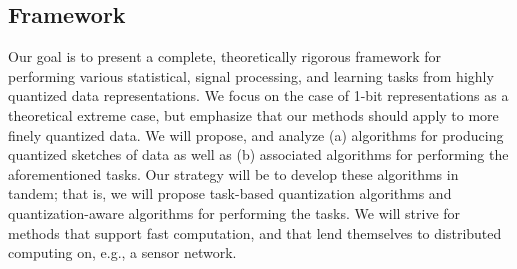\subsection{Framework}%
 Our goal  is to present a complete, theoretically rigorous framework for performing various statistical, signal processing, and learning tasks from highly quantized data representations. We focus on the case of 1-bit representations as a theoretical extreme case, but emphasize that our methods should apply to more finely quantized data. We will propose, and analyze  (a) algorithms for  producing quantized sketches of data as well as (b) associated algorithms for performing the aforementioned tasks. Our strategy will be to develop these algorithms in tandem; that is, we will propose task-based quantization algorithms and quantization-aware algorithms for performing the tasks. We will strive for methods that support fast computation, and that lend themselves to distributed computing on, e.g., a sensor network.
  
